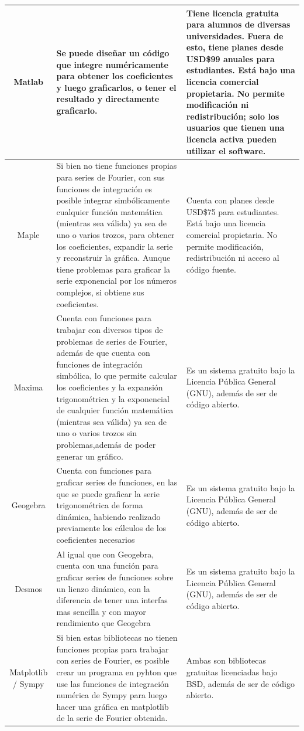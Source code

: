 \begin{longtable}{ | c | m{6.5cm} | m{4.5cm} | }
	Matlab & Se puede diseñar un código que integre numéricamente para obtener los coeficientes y luego graficarlos, o tener el resultado y directamente graficarlo. & Tiene licencia gratuita para alumnos de diversas universidades. Fuera de esto, tiene planes desde USD\$99 anuales para estudiantes. Está bajo una licencia comercial propietaria. No permite modificación ni redistribución; solo los usuarios que tienen una licencia activa pueden utilizar el software. \\ \hline
	
	Maple & Si bien no tiene funciones propias para series de Fourier, con sus funciones de integración es posible integrar simbólicamente cualquier función matemática (mientras sea válida) ya sea de uno o varios trozos, para obtener los coeficientes, expandir la serie y reconstruir la gráfica. Aunque tiene problemas para graficar la serie exponencial por los números complejos, si obtiene sus coeficientes. & Cuenta con planes desde USD\$75 para estudiantes. Está bajo una licencia comercial propietaria. No permite modificación, redistribución ni acceso al código fuente. \\ \hline
	
	Maxima & Cuenta con funciones para trabajar con diversos tipos de problemas de series de Fourier, además de que cuenta con funciones de integración simbólica, lo que permite calcular los coeficientes y la expansión trigonométrica y la exponencial de cualquier función matemática (mientras sea válida) ya sea de uno o varios trozos sin problemas,además de poder generar un gráfico. & Es un sistema gratuito bajo la Licencia Pública General (GNU), además de ser de código abierto. \\ \hline
	
	Geogebra & Cuenta con funciones para graficar series de funciones, en las que se puede graficar la serie trigonométrica de forma dinámica, habiendo realizado previamente los cálculos de los coeficientes necesarios & Es un sistema gratuito bajo la Licencia Pública General (GNU), además de ser de código abierto.  \\ \hline
	
	Desmos & Al igual que con Geogebra, cuenta con una función para graficar series de funciones sobre un lienzo dinámico, con la diferencia de tener una interfas mas sencilla y con mayor rendimiento que Geogebra & Es un sistema gratuito bajo la Licencia Pública General (GNU), además de ser de código abierto.  \\ \hline
	
	Matplotlib / Sympy & Si bien estas bibliotecas no tienen funciones propias para trabajar con series de Fourier, es posible crear un programa en pyhton que use las funciones de integración numérica de Sympy para luego hacer una gráfica en matplotlib de la serie de Fourier obtenida. & Ambas son bibliotecas gratuitas licenciadas bajo BSD, además de ser de código abierto. \\ \hline
	

\end{longtable}
